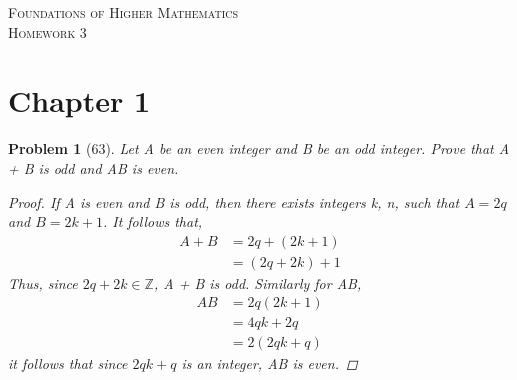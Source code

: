 \documentclass{article}
\theoremstyle{problem}
\newtheorem{prob}{Problem}
\begin{document}
\begin{center}
\textsc{\Large Foundations of Higher Mathematics}\\[.3cm]
\textsc{\Large Homework 3}
\end{center}


\section*{Chapter 1}
\begin{prob}[63]
  Let A be an even integer and B be an odd integer. Prove that A + B is odd and AB is even.
\begin{proof}
    If A is even and B is odd, then there exists integers k, n, such that $A = 2q$ and $B = 2k + 1$. It follows that, 
    \begin{align*}
      A + B &= 2q + (2k + 1)\\
            &= (2q + 2k) + 1
    \end{align*}
    Thus, since $2q + 2k \in \mathbb{Z}$, A + B is odd. Similarly for AB,
    \begin{align*}
      AB &= 2q(2k+1)\\
      &= 4qk + 2q\\
      &= 2(2qk + q)
    \end{align*}
    it follows that since $2qk+q$ is an integer, AB is even.
  \end{proof}
\end{prob}
\end{document}
